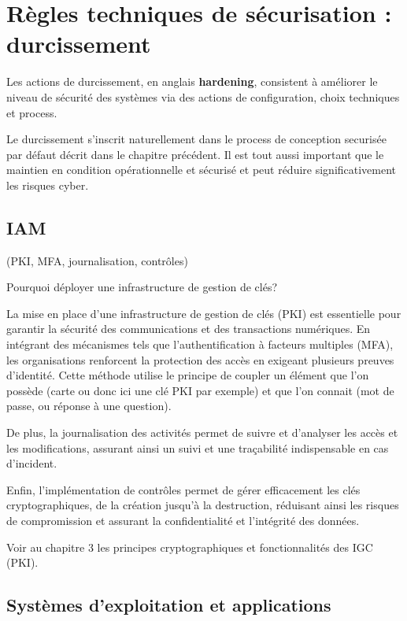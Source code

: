 \section{Règles techniques de sécurisation : durcissement}

Les actions de durcissement, en anglais \textbf{hardening}, consistent à améliorer le niveau de sécurité des systèmes via des actions de configuration, choix techniques et process.

Le durcissement s'inscrit naturellement dans le process de conception securisée par défaut décrit dans le chapitre précédent. Il est tout aussi important que le maintien en condition opérationnelle et sécurisé et peut réduire significativement les risques cyber.

\subsection{IAM} 
(PKI, MFA, journalisation, contrôles)

Pourquoi déployer une infrastructure de gestion de clés?

La mise en place d'une infrastructure de gestion de clés (PKI) est essentielle pour garantir la sécurité des communications et des transactions numériques. En intégrant des mécanismes tels que l'authentification à facteurs multiples (MFA), les organisations renforcent la protection des accès en exigeant plusieurs preuves d'identité. Cette méthode utilise le principe de coupler un élément que l'on possède (carte ou donc ici une clé PKI par exemple) et que l'on connait (mot de passe, ou réponse à une question).

De plus, la journalisation des activités permet de suivre et d'analyser les accès et les modifications, assurant ainsi un suivi et une traçabilité indispensable en cas d'incident. 

Enfin, l'implémentation de contrôles permet de gérer efficacement les clés cryptographiques, de la création jusqu'à la destruction, réduisant ainsi les risques de compromission et assurant la confidentialité et l'intégrité des données.

Voir au chapitre 3 les principes cryptographiques et fonctionnalités des IGC (PKI).

\subsection{Systèmes d'exploitation et applications}

